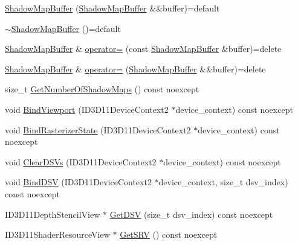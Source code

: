 \begin{DoxyCompactItemize}
\hyperlink{structmage_1_1_shadow_map_buffer_a3acb83c9c76dc9e77388b9d014894622}{Shadow\+Map\+Buffer} (\hyperlink{structmage_1_1_shadow_map_buffer}{Shadow\+Map\+Buffer} \&\&buffer)=default
\item 
\hyperlink{structmage_1_1_shadow_map_buffer_a34eedd164d45a009ddecc97c8739c80b}{$\sim$\+Shadow\+Map\+Buffer} ()=default
\item 
\hyperlink{structmage_1_1_shadow_map_buffer}{Shadow\+Map\+Buffer} \& \hyperlink{structmage_1_1_shadow_map_buffer_ace8a042252b8285a7f6ceb838053f7f6}{operator=} (const \hyperlink{structmage_1_1_shadow_map_buffer}{Shadow\+Map\+Buffer} \&buffer)=delete
\item 
\hyperlink{structmage_1_1_shadow_map_buffer}{Shadow\+Map\+Buffer} \& \hyperlink{structmage_1_1_shadow_map_buffer_a7ecdf05195a56dbbfbe473df2aad6ba6}{operator=} (\hyperlink{structmage_1_1_shadow_map_buffer}{Shadow\+Map\+Buffer} \&\&buffer)=delete
\item 
size\+\_\+t \hyperlink{structmage_1_1_shadow_map_buffer_ab0b78c26663aa303d8f72dc89ec25eea}{Get\+Number\+Of\+Shadow\+Maps} () const noexcept
\item 
void \hyperlink{structmage_1_1_shadow_map_buffer_a69c58ea895cf7cb9ef519f79927768bf}{Bind\+Viewport} (I\+D3\+D11\+Device\+Context2 $\ast$device\+\_\+context) const noexcept
\item 
void \hyperlink{structmage_1_1_shadow_map_buffer_ac85ec77ba5e39a1f50f59b6d4755c55b}{Bind\+Rasterizer\+State} (I\+D3\+D11\+Device\+Context2 $\ast$device\+\_\+context) const noexcept
\item 
void \hyperlink{structmage_1_1_shadow_map_buffer_a927a344ebb5ffeb2a6026db662708a9c}{Clear\+D\+S\+Vs} (I\+D3\+D11\+Device\+Context2 $\ast$device\+\_\+context) const noexcept
\item 
void \hyperlink{structmage_1_1_shadow_map_buffer_afdae8754fb93772df3e1b975051d8cff}{Bind\+D\+SV} (I\+D3\+D11\+Device\+Context2 $\ast$device\+\_\+context, size\+\_\+t dsv\+\_\+index) const noexcept
\item 
I\+D3\+D11\+Depth\+Stencil\+View $\ast$ \hyperlink{structmage_1_1_shadow_map_buffer_a8762dcdaca36c7a206dac362d387f0f1}{Get\+D\+SV} (size\+\_\+t dsv\+\_\+index) const noexcept
\item 
I\+D3\+D11\+Shader\+Resource\+View $\ast$ \hyperlink{structmage_1_1_shadow_map_buffer_a3c923d6cea528af3420085fafd8f9f8e}{Get\+S\+RV} () const noexcept
\end{DoxyCompactItemize}
